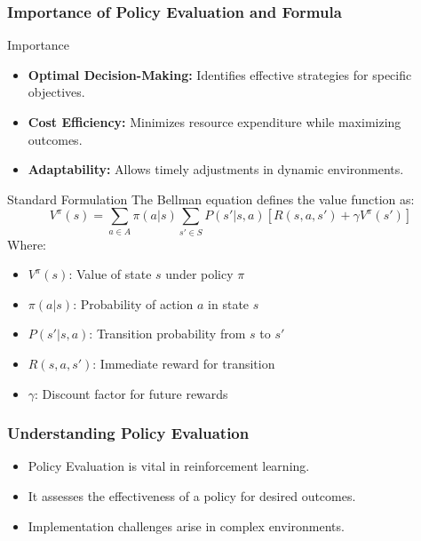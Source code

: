 \documentclass[aspectratio=169]{beamer}
\begin{document}
\begin{frame}[fragile]
    \frametitle{Importance of Policy Evaluation and Formula}
    \begin{block}{Importance}
        \begin{itemize}
            \item \textbf{Optimal Decision-Making:} Identifies effective strategies for specific objectives.
            \item \textbf{Cost Efficiency:} Minimizes resource expenditure while maximizing outcomes.
            \item \textbf{Adaptability:} Allows timely adjustments in dynamic environments.
        \end{itemize}
    \end{block}
    
    \begin{block}{Standard Formulation}
        The Bellman equation defines the value function as:
        \begin{equation}
            V^{\pi}(s) = \sum_{a \in A} \pi(a|s) \sum_{s' \in S} P(s'|s, a) [R(s, a, s') + \gamma V^{\pi}(s')]
        \end{equation}
        Where:
        \begin{itemize}
            \item $V^{\pi}(s)$: Value of state $s$ under policy $\pi$
            \item $\pi(a|s)$: Probability of action $a$ in state $s$
            \item $P(s'|s, a)$: Transition probability from $s$ to $s'$
            \item $R(s, a, s')$: Immediate reward for transition
            \item $\gamma$: Discount factor for future rewards
        \end{itemize}
    \end{block}
\end{frame}

\begin{frame}[fragile]
    \frametitle{Understanding Policy Evaluation}
    \begin{itemize}
        \item Policy Evaluation is vital in reinforcement learning.
        \item It assesses the effectiveness of a policy for desired outcomes.
        \item Implementation challenges arise in complex environments.
    \end{itemize}
\end{frame}
\end{document}
